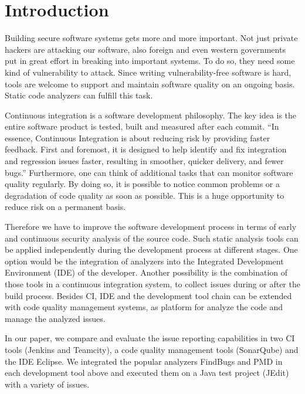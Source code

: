 \documentclass[conference]{IEEEtran}
\begin{document}
\section{Introduction}
Building secure software systems gets more and more important. Not just private hackers are attacking our software, also foreign and even western governments put in great effort in breaking into important systems\cite{NSAHacking}. To do so, they need some kind of vulnerability to attack. Since writing vulnerability-free software is hard, tools are welcome to support and maintain software quality on an ongoing basis. Static code analyzers can fulfill this task.


Continuous integration is a software development philosophy. The key idea is the entire software product is tested, built and measured after each commit. ``In essence, Continuous Integration is about reducing risk by providing faster feedback. First and foremost, it is designed to help identify and fix integration and regression issues faster, resulting in smoother, quicker delivery, and fewer bugs.''\cite{Jenkins:Smart:2011} Furthermore, one can think of additional tasks that can monitor software quality regularly. By doing so, it is possible to notice common problems or a degradation of code quality as soon as possible. This is a huge opportunity to reduce risk on a permanent basis.


Therefore we have to improve the software development process in terms of early and continuous security analysis of the source code.
Such static analysis tools can be applied independently during the development process at different stages.
One option would be the integration of analyzers into the Integrated Development Environment (IDE) of the developer.
Another possibility is the combination of those tools in a continuous integration system, to collect issues during or after the build process.
Besides CI, IDE and the development tool chain can be extended with code quality management systems, as platform for analyze the code and manage the analyzed issues.


In our paper, we compare and evaluate the issue reporting capabilities in two CI tools (Jenkins and Teamcity), a code quality management tools (SonarQube) and the IDE Eclipse.
We integrated the popular analyzers FindBugs and PMD in each development tool above and executed them on a Java test project (JEdit) with a variety of issues.


\end{document}
